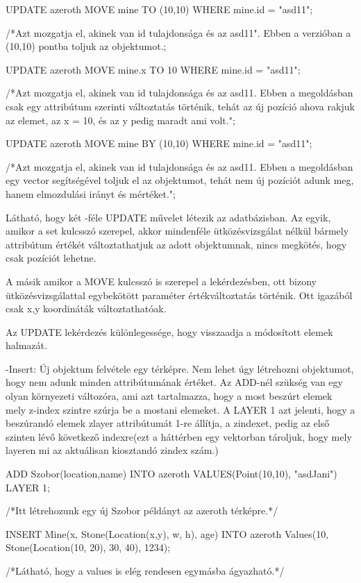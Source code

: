 \begin{sql}
\begin{sql}
UPDATE azeroth MOVE  mine TO  (10,10) WHERE mine.id = "asd11";
\end{sql}
/*Azt mozgatja el, akinek van id tulajdonsága és az asd11". Ebben a verzióban a (10,10) pontba toljuk az objektumot.;
\begin{sql}
UPDATE azeroth MOVE  mine.x TO 10 WHERE mine.id = "asd11";
\end{sql}
/*Azt mozgatja el, akinek van id tulajdonsága és az asd11. Ebben a megoldásban csak egy attribútum szerinti változtatás történik, tehát az új pozíció ahova rakjuk az elemet, az x = 10, és az y pedig maradt ami volt.";
\begin{sql}
UPDATE azeroth MOVE  mine BY  (10,10) WHERE mine.id = "asd11";
\end{sql}
/*Azt mozgatja el, akinek van id tulajdonsága és az asd11. Ebben a megoldásban egy vector segítségével toljuk el az objektumot, tehát nem új pozíciót adunk meg, hanem elmozdulási irányt és mértéket.";

Látható, hogy két -féle UPDATE művelet létezik az adatbázisban. Az egyik, amikor a set kulcsszó szerepel, akkor mindenféle ütközésvizsgálat nélkül bármely attribútum értékét változtathatjuk az adott objektumnak, nincs megkötés, hogy csak pozíciót lehetne.

A másik amikor a MOVE kulcsszó is szerepel a lekérdezésben, ott bizony ütközésvizsgálattal egybekötött paraméter értékváltoztatás történik. Ott igazából  csak x,y koordináták változtathatóak.

Az UPDATE lekérdezés különlegessége, hogy visszaadja a módosított elemek halmazát.

-Insert: Új objektum felvétele egy térképre. 
Nem lehet úgy létrehozni objektumot, hogy nem adunk minden attribútumának értéket.
Az ADD-nél szükség van egy olyan környezeti változóra, ami azt tartalmazza, hogy a most beszúrt elemek mely z-index szintre szúrja be a mostani elemeket.
A LAYER 1 azt jelenti, hogy a beszúrandó elemek zlayer attribútumát 1-re állítja, a zindexet, pedig az első szinten lévő következő indexre(ezt a háttérben egy vektorban tároljuk, hogy mely layeren mi az aktuálisan kiosztandó zindex szám.)
\begin{sql}
ADD Szobor(location,name) INTO azeroth VALUES(Point(10,10), "asdJani") LAYER 1;
\end{sql}
/*Itt létrehozunk egy új Szobor példányt az azeroth térképre.*/

\begin{sql}
INSERT Mine(x, Stone(Location(x,y), w, h), age) INTO azeroth Values(10, Stone(Location(10, 20), 30, 40), 1234);
\end{sql}
/*Látható, hogy a values is elég rendesen egymásba ágyazható.*/


\end{sql}
